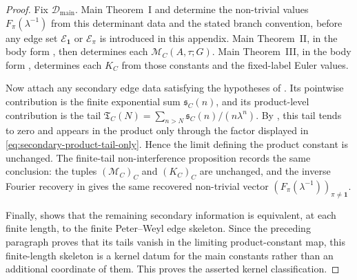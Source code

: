 \begin{proof}
  Fix \(\mathcal D_{\mathrm{main}}\).  Main Theorem~I and
   determine the non-trivial
  values \(F_\pi(\lambda^{-1})\) from this determinant data and the stated
  branch convention, before any edge set
  \(\mathcal E_{\mathbf1}\) or \(\mathcal E_\pi\) is introduced in this
  appendix.  Main Theorem~II, in the body form
  , then determines each
  \(\mathcal M_C(A,\tau;G)\).  Main Theorem~III, in the body form
  , determines each \(K_C\) from those
  constants and the fixed-label Euler values.

  Now attach any secondary edge data satisfying the hypotheses of
  .  Its pointwise contribution is the
  finite exponential sum \(\mathfrak s_C(n)\), and its product-level
  contribution is the tail
  \(\mathfrak T_C(N)=\sum_{n>N}\mathfrak s_C(n)/(n\lambda^n)\).  By
  , this tail tends to zero and
  appears in the product only through the factor displayed in
  \eqref{eq:secondary-product-tail-only}.  Hence the limit defining the
  product constant is unchanged.  The finite-tail non-interference proposition
   records the same conclusion:
  the tuples \((\mathcal M_C)_C\) and \((K_C)_C\) are unchanged, and the inverse
  Fourier recovery in  gives the
  same recovered non-trivial vector
  \((F_\pi(\lambda^{-1}))_{\pi\ne\mathbf1}\).

  Finally,  shows that the remaining
  secondary information is equivalent, at each finite length, to the finite
  Peter--Weyl edge skeleton.  Since the preceding paragraph proves that its
  tails vanish in the limiting product-constant map, this finite-length
  skeleton is a kernel datum for the main constants rather than an additional
  coordinate of them.  This proves the asserted kernel classification.
\end{proof}

